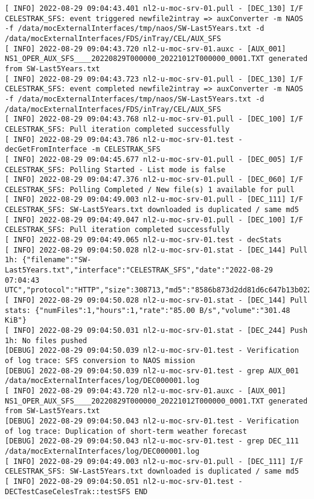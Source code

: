 \documentclass[dec_sum_main.tex]{subfiles}
\begin{document}
\begin{Verbatim}[fontsize=\tiny]
[ INFO] 2022-08-29 09:04:43.401 nl2-u-moc-srv-01.pull - [DEC_130] I/F CELESTRAK_SFS: event triggered newfile2intray => auxConverter -m NAOS -f /data/mocExternalInterfaces/tmp/naos/SW-Last5Years.txt -d /data/mocExternalInterfaces/FDS/inTray/CEL/AUX_SFS
[ INFO] 2022-08-29 09:04:43.720 nl2-u-moc-srv-01.auxc - [AUX_001] NS1_OPER_AUX_SFS____20220829T000000_20221012T000000_0001.TXT generated from SW-Last5Years.txt
[ INFO] 2022-08-29 09:04:43.723 nl2-u-moc-srv-01.pull - [DEC_130] I/F CELESTRAK_SFS: event completed newfile2intray => auxConverter -m NAOS -f /data/mocExternalInterfaces/tmp/naos/SW-Last5Years.txt -d /data/mocExternalInterfaces/FDS/inTray/CEL/AUX_SFS
[ INFO] 2022-08-29 09:04:43.768 nl2-u-moc-srv-01.pull - [DEC_100] I/F CELESTRAK_SFS: Pull iteration completed successfully
[ INFO] 2022-08-29 09:04:43.786 nl2-u-moc-srv-01.test - decGetFromInterface -m CELESTRAK_SFS
[ INFO] 2022-08-29 09:04:45.677 nl2-u-moc-srv-01.pull - [DEC_005] I/F CELESTRAK_SFS: Polling Started - List mode is false
[ INFO] 2022-08-29 09:04:47.376 nl2-u-moc-srv-01.pull - [DEC_060] I/F CELESTRAK_SFS: Polling Completed / New file(s) 1 available for pull
[ INFO] 2022-08-29 09:04:49.003 nl2-u-moc-srv-01.pull - [DEC_111] I/F CELESTRAK_SFS: SW-Last5Years.txt downloaded is duplicated / same md5
[ INFO] 2022-08-29 09:04:49.047 nl2-u-moc-srv-01.pull - [DEC_100] I/F CELESTRAK_SFS: Pull iteration completed successfully
[ INFO] 2022-08-29 09:04:49.065 nl2-u-moc-srv-01.test - decStats
[ INFO] 2022-08-29 09:04:50.028 nl2-u-moc-srv-01.stat - [DEC_144] Pull 1h: {"filename":"SW-Last5Years.txt","interface":"CELESTRAK_SFS","date":"2022-08-29 07:04:43 UTC","protocol":"HTTP","size":308713,"md5":"8586b873d2dd81d6c647b13b0223355f"}
[ INFO] 2022-08-29 09:04:50.028 nl2-u-moc-srv-01.stat - [DEC_144] Pull stats: {"numFiles":1,"hours":1,"rate":"85.00 B/s","volume":"301.48 KiB"}
[ INFO] 2022-08-29 09:04:50.031 nl2-u-moc-srv-01.stat - [DEC_244] Push 1h: No files pushed
[DEBUG] 2022-08-29 09:04:50.039 nl2-u-moc-srv-01.test - Verification of log trace: SFS conversion to NAOS mission
[DEBUG] 2022-08-29 09:04:50.039 nl2-u-moc-srv-01.test - grep AUX_001 /data/mocExternalInterfaces/log/DEC000001.log
[ INFO] 2022-08-29 09:04:43.720 nl2-u-moc-srv-01.auxc - [AUX_001] NS1_OPER_AUX_SFS____20220829T000000_20221012T000000_0001.TXT generated from SW-Last5Years.txt
[DEBUG] 2022-08-29 09:04:50.043 nl2-u-moc-srv-01.test - Verification of log trace: Duplication of short-term weather forecast
[DEBUG] 2022-08-29 09:04:50.043 nl2-u-moc-srv-01.test - grep DEC_111 /data/mocExternalInterfaces/log/DEC000001.log
[ INFO] 2022-08-29 09:04:49.003 nl2-u-moc-srv-01.pull - [DEC_111] I/F CELESTRAK_SFS: SW-Last5Years.txt downloaded is duplicated / same md5
[ INFO] 2022-08-29 09:04:50.051 nl2-u-moc-srv-01.test - DECTestCaseCelesTrak::testSFS END
\end{Verbatim}
\end{document}
